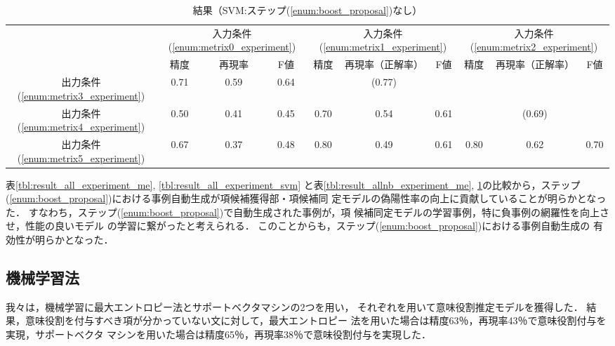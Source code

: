 \documentclass[japanese]{jnlp_1.2b}
\begin{document}
\begin{table}[b]
 \begin{center}
  \caption{結果（SVM:ステップ(\ref{enum:boost_proposal})なし）}
  \label{tbl:result_allnb_experiment_svm}
  \setlength{\tabcolsep}{1.5mm}
  \begin{tabular}{c|ccc|ccc|ccc}
   \hline
   & \multicolumn{3}{|c|}{入力条件(\ref{enum:metrix0_experiment})}
   & \multicolumn{3}{|c|}{入力条件(\ref{enum:metrix1_experiment})}
   & \multicolumn{3}{|c}{入力条件(\ref{enum:metrix2_experiment})} \\
   & 精度 & 再現率 & F値
   & 精度 & 再現率（正解率） & F値
   & 精度 & 再現率（正解率） & F値 \\
   \hline
   出力条件(\ref{enum:metrix3_experiment}) & 0.71 & 0.59 & 0.64  &  &
   (0.77) &  &  &  & \\
   出力条件(\ref{enum:metrix4_experiment}) & 0.50 & 0.41 & 0.45  & 0.70
   & 0.54 & 0.61  &  & (0.69) & \\
   出力条件(\ref{enum:metrix5_experiment}) & 0.67 & 0.37 & 0.48  & 0.80
   & 0.49 & 0.61  & 0.80 & 0.62 & 0.70 \\
   \hline
  \end{tabular}
 \end{center}
\end{table}

表\ref{tbl:result_all_experiment_me},
\ref{tbl:result_all_experiment_svm}
と表\ref{tbl:result_allnb_experiment_me},
\ref{tbl:result_allnb_experiment_svm}の比較から，ステップ
(\ref{enum:boost_proposal})における事例自動生成が項候補獲得部・項候補同
定モデルの偽陽性率の向上に貢献していることが明らかとなった．
すなわち，ステップ(\ref{enum:boost_proposal})で自動生成された事例が，項
候補同定モデルの学習事例，特に負事例の網羅性を向上させ，性能の良いモデル
の学習に繋がったと考えられる．
このことからも，ステップ(\ref{enum:boost_proposal})における事例自動生成の
有効性が明らかとなった．





\subsection*{機械学習法}

我々は，機械学習に最大エントロピー法とサポートベクタマシンの2つを用い，
それぞれを用いて意味役割推定モデルを獲得した．
結果，意味役割を付与すべき項が分かっていない文に対して，最大エントロピー
法を用いた場合は精度63％，再現率43％で意味役割付与を実現，サポートベクタ
マシンを用いた場合は精度65％，再現率38％で意味役割付与を実現した．
\end{document}
